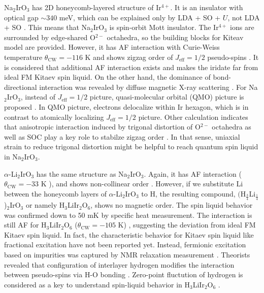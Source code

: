 \documentclass[a4,10.5pt]{report}
\begin{document}
Na$_2$IrO$_3$ has 2D honeycomb-layered structure of Ir$^{4+}$.
It is an insulator with optical gap $\sim 340$ meV, which can be explained only by LDA + SO + $U$, not LDA + SO \cite{comin20122}.
This means that Na$_2$IrO$_3$ is spin-orbit Mott insulator.
The Ir$^{4+}$ ions are surrounded by edge-shared O$^{2-}$ octahedra, so the building blocks for Kiteav model are provided.
However, it has AF interaction with Curie-Weiss temperature $\theta_{\mathrm{CW}} = - 116$ K \cite{singh2010antiferromagnetic} 
and shows zigzag order of $J_{\mathrm{eff}} = 1/2$ pseudo-spins \cite{ye2012direct}.
It is considered that additional AF interaction exists and makes the iridate far from ideal FM Kitaev spin liquid.
On the other hand, the dominance of bond-directional interaction was revealed by diffuse magnetic X-ray scattering \cite{chun2015direct}.
For Na$_2$IrO$_3$, instead of $J_{\mathrm{eff}} = 1/2$ picture, quasi-molecular orbital (QMO) picture is proposed \cite{mazin20122}.
In QMO picture, electrons delocalize within Ir hexagon, which is in contrast to atomically localizing $J_{\mathrm{eff}} = 1/2$ picture.
Other calculation indicates that anisotropic interaction induced by trigonal distortion of O$^{2-}$ octahedra as well as SOC play a key role to stabilze zigzag order 
\cite{yamaji2014first}.
In that sense, uniaxial strain to reduce trigonal distortion might be helpful to reach quantum spin liquid in Na$_2$IrO$_3$.


$\alpha$-Li$_2$IrO$_3$ has the same structure as Na$_2$IrO$_3$.
Again, it has AF interaction ($\theta_{\mathrm{CW}} = - 33$ K \cite{singh2012relevance}),
and shows non-collinear order \cite{williams2016incommensurate}.
However, if we substitute Li between the honeycomb layers of $\alpha$-Li$_2$IrO$_3$ to H, 
the resulting compound, $($H$_{\frac{3}{4}}$Li$_{\frac{1}{4}}$)$_2$IrO$_3$ 
or namely H$_3$LiIr$_2$O$_6$, shows no magnetic order.
The spin liquid behavior was confirmed down to 50 mK by specific heat measurement. 
The interaction is still AF for H$_3$LiIr$_2$O$_6$ ($\theta_{\mathrm{CW}} = -105$ K) \cite{kitagawa2018spin}, suggesting the deviation from ideal FM Kitaev spin liquid.
In fact, the characteristic behavior for Kitaev spin liquid like fractional excitation have not been reported yet.
Instead, fermionic excitation based on impurities was captured by NMR relaxation measurement \cite{kitagawa2018spin}.
Theorists revealed that configuration of interlayer hydrogen modifies the interaction between pseudo-spins via H-O bonding \cite{li2018role}.
Zero-point fluctution of hydrogen is considered as a key to understand spin-liquid behavior in H$_3$LiIr$_2$O$_6$ \cite{li2018role}.
\end{document}
